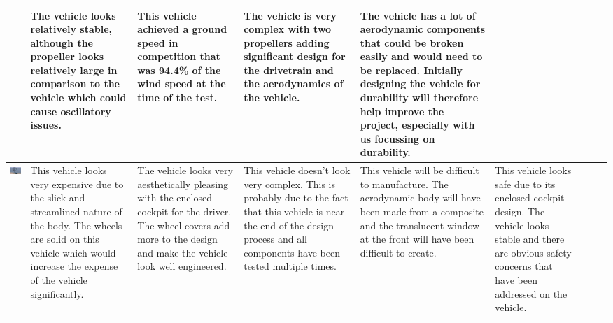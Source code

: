 \begin{table}[p]
\begin{tabular}{|m{5cm}|m{\x}|m{\x}|m{\x}|m{\x}|m{\x}|m{\x}|m{\x}|m{\x}|}
      &  
      The vehicle looks relatively stable, although the propeller looks relatively large in comparison to the vehicle which could cause oscillatory issues.
      &  
      This vehicle achieved a ground speed in competition that was 94.4\% of the wind speed at the time of the test.
      &  
      The vehicle is very complex with two propellers adding significant design for the drivetrain and the aerodynamics of the vehicle. 
      &  
      The vehicle has a lot of aerodynamic components that could be broken easily and would need to be replaced. Initially designing the vehicle for durability will therefore help improve the project, especially with us focussing on durability.
      \\ \hline
      
      \includegraphics[width=\linewidth]{images/part1/exisitingVeh2.png}
      &
      This vehicle looks very expensive due to the slick and streamlined nature of the body. The wheels are solid on this vehicle which would increase the expense of the vehicle significantly.
      &  
      The vehicle looks very aesthetically pleasing with the enclosed cockpit for the driver. The wheel covers add more to the design and make the vehicle look well engineered. 
      &  
      This vehicle doesn't look very complex. This is probably due to the fact that this vehicle is near the end of the design process and all components have been tested multiple times. 
      &  
      This vehicle will be difficult to manufacture. The aerodynamic body will have been made from a composite and the translucent window at the front will have been difficult to create. 
      &  
      This vehicle looks safe due to its enclosed cockpit design. The vehicle looks stable and there are obvious safety concerns that have been addressed on the vehicle. 

\end{tabular}
\end{table}
